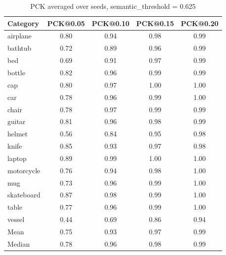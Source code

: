 \begin{table}[h]
\centering
\caption{PCK averaged over seeds, semantic\_threshold = 0.625}
\label{tab:pck_thresh_0_75}
\begin{tabular}{lcccc}
\toprule
Category & PCK@0.05 & PCK@0.10 & PCK@0.15 & PCK@0.20 \\
\midrule
airplane & 0.80 & 0.94 & 0.98 & 0.99 \\
bathtub & 0.72 & 0.89 & 0.96 & 0.99 \\
bed & 0.69 & 0.91 & 0.97 & 0.99 \\
bottle & 0.82 & 0.96 & 0.99 & 0.99 \\
cap & 0.80 & 0.97 & 1.00 & 1.00 \\
car & 0.78 & 0.96 & 0.99 & 1.00 \\
chair & 0.78 & 0.97 & 0.99 & 0.99 \\
guitar & 0.81 & 0.96 & 0.98 & 0.99 \\
helmet & 0.56 & 0.84 & 0.95 & 0.98 \\
knife & 0.85 & 0.93 & 0.97 & 0.98 \\
laptop & 0.89 & 0.99 & 1.00 & 1.00 \\
motorcycle & 0.76 & 0.94 & 0.98 & 1.00 \\
mug & 0.73 & 0.96 & 0.99 & 1.00 \\
skateboard & 0.87 & 0.98 & 0.99 & 1.00 \\
table & 0.77 & 0.96 & 0.99 & 1.00 \\
vessel & 0.44 & 0.69 & 0.86 & 0.94 \\
\midrule
Mean & 0.75 & 0.93 & 0.97 & 0.99 \\
Median & 0.78 & 0.96 & 0.98 & 0.99 \\
\bottomrule
\end{tabular}
\end{table}

